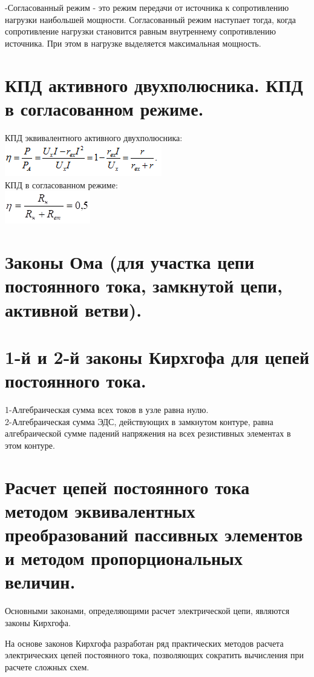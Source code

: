 \documentclass[a4paper, 12pt]{article}
\begin{document}
-Согласованный режим - это режим передачи от источника к сопротивлению нагрузки наибольшей мощности. Согласованный режим наступает тогда, когда сопротивление нагрузки становится равным внутреннему сопротивлению источника. При этом в нагрузке выделяется максимальная мощность.

\section{КПД активного двухполюсника. КПД в согласованном режиме.}
КПД эквивалентного активного двухполюсника:\\
\includegraphics{14-1.png}\\
КПД в согласованном режиме:\\
\includegraphics{14-2.png}
\section{Законы Ома (для участка цепи постоянного тока, замкнутой цепи, активной ветви).}

\section{1-й и 2-й законы Кирхгофа для цепей постоянного тока.}
1-Алгебраическая сумма всех токов в узле равна нулю.\\
2-Алгебраическая сумма ЭДС, действующих в замкнутом контуре, равна алгебраической сумме падений напряжения на всех резистивных элементах в этом контуре.\\
\section{Расчет цепей постоянного тока методом эквивалентных преобразований пассивных элементов и методом пропорциональных величин.}
Основными законами, определяющими расчет электрической цепи, являются законы Кирхгофа.

На основе законов Кирхгофа разработан ряд практических методов расчета электрических цепей постоянного тока, позволяющих сократить вычисления при расчете сложных схем.
\end{document}
